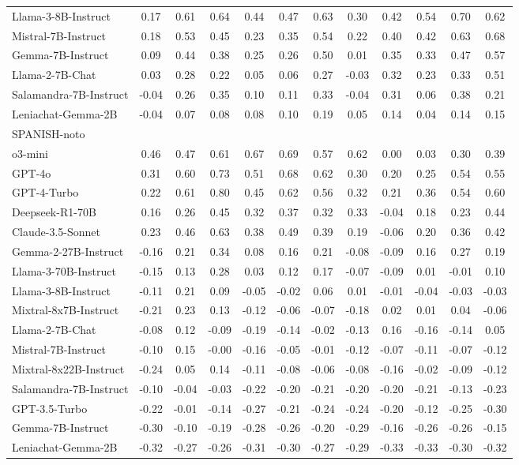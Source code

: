 \begin{table*}[ht]
{\begin{tabular}{lccccccccccc}
Llama-3-8B-Instruct & 0.17 & 0.61 & 0.64 & 0.44 & 0.47 & 0.63 & 0.30 & 0.42 & 0.54 & 0.70 & 0.62 \\
Mistral-7B-Instruct & 0.18 & 0.53 & 0.45 & 0.23 & 0.35 & 0.54 & 0.22 & 0.40 & 0.42 & 0.63 & 0.68 \\
Gemma-7B-Instruct & 0.09 & 0.44 & 0.38 & 0.25 & 0.26 & 0.50 & 0.01 & 0.35 & 0.33 & 0.47 & 0.57 \\
Llama-2-7B-Chat & 0.03 & 0.28 & 0.22 & 0.05 & 0.06 & 0.27 & -0.03 & 0.32 & 0.23 & 0.33 & 0.51 \\
Salamandra-7B-Instruct & -0.04 & 0.26 & 0.35 & 0.10 & 0.11 & 0.33 & -0.04 & 0.31 & 0.06 & 0.38 & 0.21 \\
Leniachat-Gemma-2B & -0.04 & 0.07 & 0.08 & 0.08 & 0.10 & 0.19 & 0.05 & 0.14 & 0.04 & 0.14 & 0.15 \\
\midrule
SPANISH-noto &&&&&&&&&&&\\
\midrule
o3-mini & 0.46 & 0.47 & 0.61 & 0.67 & 0.69 & 0.57 & 0.62 & 0.00 & 0.03 & 0.30 & 0.39 \\
GPT-4o & 0.31 & 0.60 & 0.73 & 0.51 & 0.68 & 0.62 & 0.30 & 0.20 & 0.25 & 0.54 & 0.55 \\
GPT-4-Turbo & 0.22 & 0.61 & 0.80 & 0.45 & 0.62 & 0.56 & 0.32 & 0.21 & 0.36 & 0.54 & 0.60 \\
Deepseek-R1-70B & 0.16 & 0.26 & 0.45 & 0.32 & 0.37 & 0.32 & 0.33 & -0.04 & 0.18 & 0.23 & 0.44 \\
Claude-3.5-Sonnet & 0.23 & 0.46 & 0.63 & 0.38 & 0.49 & 0.39 & 0.19 & -0.06 & 0.20 & 0.36 & 0.42 \\
Gemma-2-27B-Instruct & -0.16 & 0.21 & 0.34 & 0.08 & 0.16 & 0.21 & -0.08 & -0.09 & 0.16 & 0.27 & 0.19 \\
Llama-3-70B-Instruct & -0.15 & 0.13 & 0.28 & 0.03 & 0.12 & 0.17 & -0.07 & -0.09 & 0.01 & -0.01 & 0.10 \\
Llama-3-8B-Instruct & -0.11 & 0.21 & 0.09 & -0.05 & -0.02 & 0.06 & 0.01 & -0.01 & -0.04 & -0.03 & -0.03 \\
Mixtral-8x7B-Instruct & -0.21 & 0.23 & 0.13 & -0.12 & -0.06 & -0.07 & -0.18 & 0.02 & 0.01 & 0.04 & -0.06 \\
Llama-2-7B-Chat & -0.08 & 0.12 & -0.09 & -0.19 & -0.14 & -0.02 & -0.13 & 0.16 & -0.16 & -0.14 & 0.05 \\
Mistral-7B-Instruct & -0.10 & 0.15 & -0.00 & -0.16 & -0.05 & -0.01 & -0.12 & -0.07 & -0.11 & -0.07 & -0.12 \\
Mixtral-8x22B-Instruct & -0.24 & 0.05 & 0.14 & -0.11 & -0.08 & -0.06 & -0.08 & -0.16 & -0.02 & -0.09 & -0.12 \\
Salamandra-7B-Instruct & -0.10 & -0.04 & -0.03 & -0.22 & -0.20 & -0.21 & -0.20 & -0.20 & -0.21 & -0.13 & -0.23 \\
GPT-3.5-Turbo & -0.22 & -0.01 & -0.14 & -0.27 & -0.21 & -0.24 & -0.24 & -0.20 & -0.12 & -0.25 & -0.30 \\
Gemma-7B-Instruct & -0.30 & -0.10 & -0.19 & -0.28 & -0.26 & -0.20 & -0.29 & -0.16 & -0.26 & -0.26 & -0.15 \\
Leniachat-Gemma-2B & -0.32 & -0.27 & -0.26 & -0.31 & -0.30 & -0.27 & -0.29 & -0.33 & -0.33 & -0.30 & -0.32 \\
\bottomrule
\end{tabular}
}


\end{table*}
